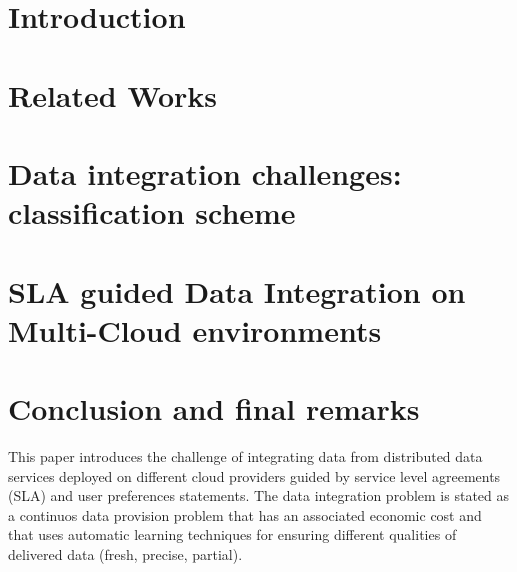 \documentclass{llncs}
\begin{document}
%



\section{Introduction}
\label{sec:intro}
 
\section{Related Works}\label{sec:rw}

\section{Data integration challenges: classification scheme}\label{sec:sm}


\section{SLA guided Data Integration on Multi-Cloud environments}\label{sec:approach}




\section{Conclusion and final remarks}\label{sec:conc}
This paper introduces the challenge of integrating data from distributed data services deployed on different cloud providers guided by service level agreements (SLA) and user preferences statements. The data integration problem is stated as a continuos data provision problem that has an associated economic cost and that uses automatic learning techniques for ensuring different qualities of delivered data (fresh, precise, partial).
\end{document}
